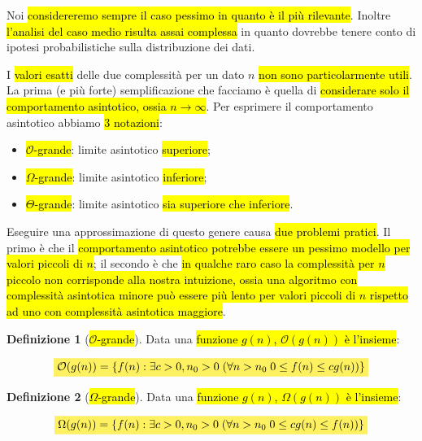 \documentclass[a4paper,11pt,twoside]{article}
\theoremstyle{plain}
\theoremstyle{definition}
\newtheorem{defn}{Definizione}[section]
\theoremstyle{remark}
\newcommand{\mhl}[1]{\colorbox{hlcolor}{$\displaystyle #1$}}
\begin{document}
Noi \hl{considereremo sempre il caso pessimo in quanto è il più rilevante}.
Inoltre \hl{l'analisi del caso medio risulta assai complessa} in quanto dovrebbe
tenere conto di ipotesi probabilistiche sulla distribuzione dei dati.

I \hl{valori esatti} delle due complessità per un dato $n$ \hl{non sono
particolarmente utili}. La prima (e più forte) semplificazione che facciamo è
quella di \hl{considerare solo il comportamento asintotico, ossia $n \to
\infty$}. Per esprimere il comportamento asintotico abbiamo \hl{3 notazioni}:

\begin{itemize}
  \item \hl{$\mathcal{O}$-grande}: limite asintotico \hl{superiore};
  \item \hl{$\Omega$-grande}: limite asintotico \hl{inferiore};
  \item \hl{$\Theta$-grande}: limite asintotico \hl{sia superiore che
    inferiore}.
\end{itemize}

Eseguire una approssimazione di questo genere causa \hl{due problemi pratici}.
Il primo è che il \hl{comportamento asintotico potrebbe essere un pessimo
modello per valori piccoli di $n$}; il secondo è che \hl{in qualche raro caso la
complessità per $n$ piccolo non corrisponde alla nostra intuizione, ossia una
algoritmo con complessità asintotica minore può essere più lento per valori
piccoli di $n$ rispetto ad uno con complessità asintotica maggiore}.

\begin{defn}[\hl{$\mathcal{O}$-grande}]\label{def:o-grande}
  Data una \hl{funzione $g(n)$, $\mathcal{O}(g(n))$ è l'insieme}:

  \begin{equation}
    \mhl{
      \mathcal{O}(g(n)) = \{ f(n) : \exists c>0, n_0>0 \; (\forall n>n_0 \;
        0 \leq f(n) \leq cg(n)) \}
    }
  \end{equation}
\end{defn}

\begin{defn}[\hl{$\Omega$-grande}]\label{def:omega-grande}
  Data una \hl{funzione $g(n)$, $\Omega(g(n))$ è l'insieme}:

  \begin{equation}
    \mhl{
      \Omega(g(n)) = \{ f(n) : \exists c>0, n_0>0 \; (\forall n>n_0 \;
        0 \leq cg(n) \leq f(n)) \}
    }
  \end{equation}
\end{defn}
\end{document}
